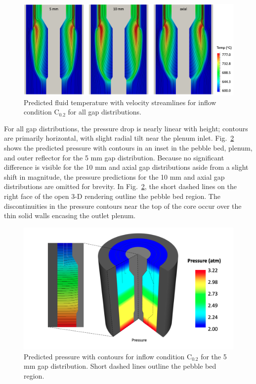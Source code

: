 \begin{figure}[h!]
\centering
\hspace{1.2cm}
\includegraphics[width=0.9\linewidth]{figs/fluid_temp_all.png}
\caption{Predicted fluid temperature with velocity streamlines for inflow condition C$_\text{0.2}$ for all gap distributions.}
\label{fig:fluid_temp_all}
\end{figure}

For all gap distributions, the pressure drop is nearly linear with height; contours are primarily horizontal, with slight radial tilt near the plenum inlet. Fig.\ \ref{fig:pressure_all} shows the predicted pressure with contours in an inset in the pebble bed, plenum, and outer reflector for the 5 \si{\milli\meter} gap distribution. Because no significant difference is visible for the 10 \si{\milli\meter} and axial gap distributions aside from a slight shift in magnitude, the pressure predictions for the 10 \si{\milli\meter} and axial gap distributions are omitted for brevity. In Fig.\ \ref{fig:pressure_all}, the short dashed lines on the right face of the open 3-D rendering outline the pebble bed region. The discontinuities in the pressure contours near the top of the core occur over the thin solid walls encasing the outlet plenum.

\begin{figure}[h!]
\centering
\hspace{1.2cm}
\includegraphics[height=0.4\linewidth]{figs/pressure_all.png}
\caption{Predicted pressure with contours for inflow condition C$_\text{0.2}$ for the 5 \si{\milli\meter} gap distribution. Short dashed lines outline the pebble bed region.}
\label{fig:pressure_all}
\end{figure}

